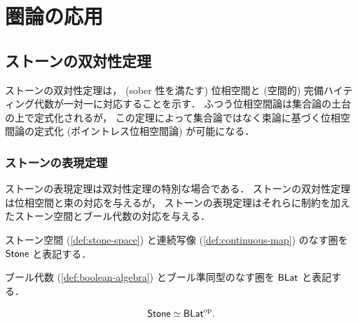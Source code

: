 \documentclass[titlepage]{ltjsreport}
\newtheorem[S]{theorem}{定理}[chapter]
\newtheorem[S]{definition}[theorem]{定義}
\newtheorem[S]{example}[theorem]{例}
\begin{document}
\chapter{圏論の応用}

\section{ストーンの双対性定理}

ストーンの双対性定理は，
(sober 性を満たす)
位相空間と
(空間的)
完備ハイティング代数が一対一に対応することを示す．
ふつう位相空間論は集合論の土台の上で定式化されるが，
この定理によって集合論ではなく束論に基づく位相空間論の定式化
(ポイントレス位相空間論)
が可能になる．

\subsection{ストーンの表現定理}

ストーンの表現定理は双対性定理の特別な場合である．
ストーンの双対性定理は位相空間と束の対応を与えるが，
ストーンの表現定理はそれらに制約を加えたストーン空間とブール代数の対応を与える．

\begin{definition}[ストーン空間の圏]
  ストーン空間
  (\cref{def:stone-space})
  と連続写像
  (\cref{def:continuous-map})
  のなす圏を $\mathsf{Stone}$ と表記する．
\end{definition}

\begin{definition}[ブール代数の圏]
  ブール代数 (\cref{def:boolean-algebra})
  とブール準同型のなす圏を $\mathsf{BLat}$ と表記する．
\end{definition}

\newcommand{\spec}{\operatorname{spec}}
\newcommand{\clop}{\operatorname{clop}}

\begin{theorem}[ストーンの表現定理]
  \begin{equation}
    \mathsf{Stone}\simeq\mathsf{BLat}^\mathrm{op}.
  \end{equation}
\end{theorem}
\end{document}

